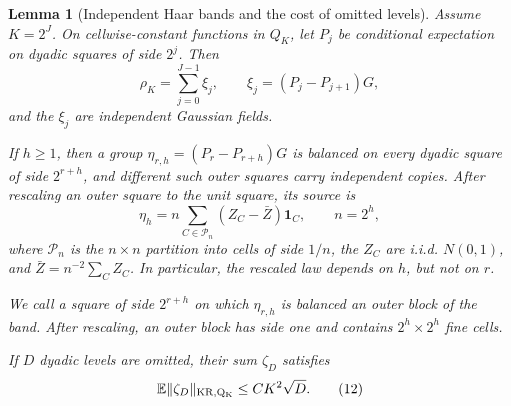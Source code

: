 \documentclass{smfart}
\newtheorem{lemma}[theorem]{Lemma}
\theoremstyle{definition}
\newcommand{\1}{\mathbf 1}
\begin{document}
\begin{lemma}[Independent Haar bands and the cost of omitted levels]\label{lem:dyadic-bands}
Assume $K=2^J$. On cellwise-constant functions in $Q_ K$, let $P_ j$
be conditional expectation on dyadic squares of side $2^j$. Then
\begin{equation}
\rho_ K=\sum_ {j=0}^{J-1}\xi_ j,
\qquad \xi_ j=(P_ j-P_ {j+1})G,
\tag{10}
\end{equation}
and the $\xi_ j$ are independent Gaussian fields.

If $h\geq1$, then a group
$\eta_ {r,h}=(P_ r-P_ {r+h})G$ is balanced on every dyadic square of side
$2^{r+h}$, and different such outer squares carry independent copies.
After rescaling an outer square to the unit square, its source is
\begin{equation}
\eta_ h=n\sum_ {C\in\mathcal P_ n}(Z_ C-\bar Z)\mathbf1_ C,
\qquad n=2^h,
\tag{11}
\end{equation}
where $\mathcal P_ n$ is the $n\times n$ partition into cells of side
$1/n$, the $Z_ C$ are i.i.d. $N(0,1)$, and
$\bar Z=n^{-2}\sum_ CZ_ C$. In particular, the rescaled law depends on
$h$, but not on $r$.

We call a square of side $2^{r+h}$ on which $\eta_{r,h}$ is balanced an
\emph{outer block} of the band.  After rescaling, an outer block has side
one and contains $2^h\times2^h$ fine cells.

If $D$ dyadic levels are omitted, their sum $\zeta_ D$ satisfies
\begin{equation}
\mathbb E\|\zeta_ D\|_ {\rm KR,Q_ K}\leq CK^2\sqrt D.
\tag{12}
\end{equation}

\end{lemma}
\end{document}
